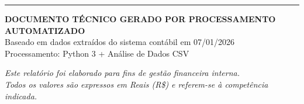 \documentclass[12pt, a4paper]{article}
\begin{document}
\vspace{2cm}

\begin{center}
    \rule{12cm}{0.5pt}

    \vspace{1cm}

    \textbf{DOCUMENTO TÉCNICO GERADO POR PROCESSAMENTO AUTOMATIZADO} \\
    \vspace{0.3cm}
    {\small Baseado em dados extraídos do sistema contábil em 07/01/2026} \\
    {\small Processamento: Python 3 + Análise de Dados CSV} \\

    \vspace{1cm}

    \textit{Este relatório foi elaborado para fins de gestão financeira interna.} \\
    \textit{Todos os valores são expressos em Reais (R\$) e referem-se à competência indicada.}
\end{center}
\end{document}
